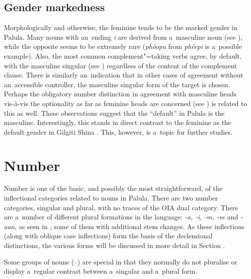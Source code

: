 \subsection{Gender markedness}
\label{subsec:4-3-3}

Morphologically and otherwise, the feminine tends to be the marked gender in Palula. Many nouns with an~ending \textit{i} are derived from a~masculine noun (see ), while the opposite seems to be extremely rare (\textit{phóopu} from \textit{phéepi} is a~possible example). Also, the most common complement"=taking verbs agree, by default, with the masculine singular (see ) regardless of the content of the complement clause. There is similarly an~indication that in other cases of agreement without an~accessible controller, the masculine singular form of the target is chosen. Perhaps the obligatory number distinction in agreement with masculine heads vis-à-vis the optionality as far as feminine heads are concerned (see ) is related to this as well. These observations suggest that the ``default'' in Palula is the masculine. Interestingly, this stands in direct contrast to the feminine as the default gender in Gilgiti Shina \citep[176]{hookzia2005}. This, however, is a~topic for further studies.

\section{Number}
\label{sec:4-4}

Number is one of the basic, and possibly the most straightforward, of the inflectional categories related to nouns in Palula. There are two number categories, singular and plural, with no traces of the OIA dual category. There are a~number of different plural formations in the language: \textit{-a, -i, -m, -ee} and \textit{-aan}, as seen in , some of them with additional stem changes. As these inflections (along with oblique case inflections) form the basis of the declensional distinctions, the various forms will be discussed in more detail in Section . 

Some groups of nouns (--) are special in that they normally do not pluralise or display a~regular contrast between a~singular and a~plural form.



